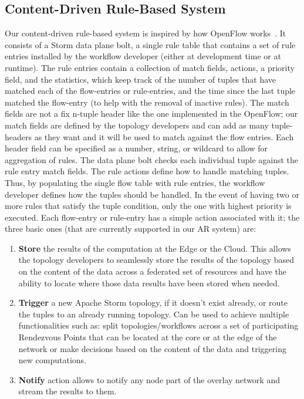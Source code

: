 \subsection{Content-Driven Rule-Based System}
Our content-driven rule-based system is inspired by how OpenFlow works~\cite{openflow}. It consists of a Storm data plane bolt, a single rule table that contains a set of rule entries installed by the workflow developer (either at development time or at runtime). The rule entries contain a collection of match fields, actions, a priority field, and the statistics, which keep track of the number of tuples that have matched each of the flow-entries or rule-entries, and the time since the last tuple matched the flow-entry (to help with the removal of inactive rules). The match fields are not a fix n-tuple header like the one implemented in the OpenFlow; our match fields are defined by the topology developers and can add as many tuple-headers as they want and it will be used to match against the flow entries. Each header field can be specified as a number, string, or wildcard to allow for aggregation of rules. The data plane bolt checks each individual tuple against the rule entry match fields. The rule actions define how to handle matching tuples. Thus, by populating the single flow table with rule entries, the workflow developer defines how the tuples should be handled. In the event of having two or more rules that satisfy the tuple condition, only the one with highest priority is executed. Each flow-entry or rule-entry has a simple action associated with it; the three basic ones (that are currently supported in our AR system) are:

\begin{enumerate}
  \item \textbf{Store} the results of the computation at the Edge or the Cloud. This allows the topology developers to seamlessly store the results of the topology based on the content of the data across a federated set of resources and have the ability to locate where those data results have been stored when needed.
  \item \textbf{Trigger} a new Apache Storm topology, if it doesn't exist already, or route the tuples to an already running topology. Can be used to achieve multiple functionalities such as: split topologies/workflows across a set of participating Rendezvous Points that can be located at the core or at the edge of the network or make decisions based on the content of the data and triggering new computations.
  \item \textbf{Notify} action allows to notify any node part of the overlay network and stream the results to them.
\end{enumerate}

